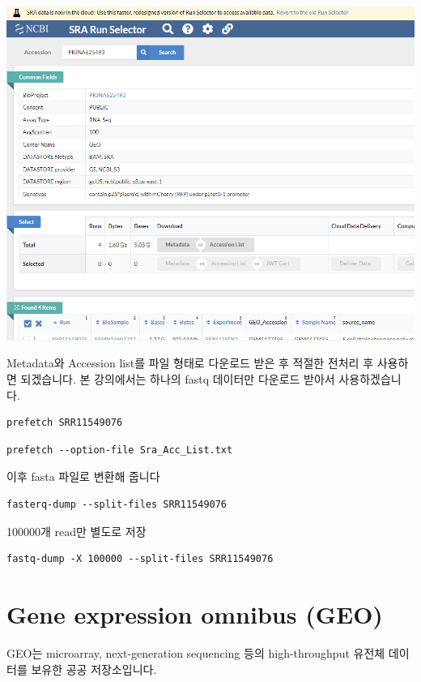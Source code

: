 \documentclass[
]{book}
\begin{document}
\includegraphics[width=6.25in,height=\textheight]{images/sra.PNG}

Metadata와 Accession list를 파일 형태로 다운로드 받은 후 적절한 전처리 후 사용하면 되겠습니다. 본 강의에서는 하나의 fastq 데이터만 다운로드 받아서 사용하겠습니다.

\begin{verbatim}
prefetch SRR11549076
\end{verbatim}

\begin{verbatim}
prefetch --option-file Sra_Acc_List.txt
\end{verbatim}

이후 fasta 파일로 변환해 줍니다

\begin{verbatim}
fasterq-dump --split-files SRR11549076
\end{verbatim}

100000개 read만 별도로 저장

\begin{verbatim}
fastq-dump -X 100000 --split-files SRR11549076
\end{verbatim}

\hypertarget{gene-expression-omnibus-geo}{%
\section{Gene expression omnibus (GEO)}\label{gene-expression-omnibus-geo}}

GEO는 microarray, next-generation sequencing 등의 high-throughput 유전체 데이터를 보유한 공공 저장소입니다.
\end{document}
